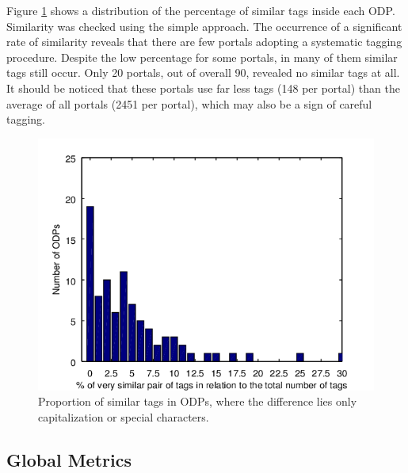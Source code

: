 Figure \ref{fig:similarity} shows a distribution of the percentage of similar tags inside each ODP.
Similarity was checked using the simple approach.
The occurrence of a significant rate of similarity reveals that there are few portals adopting a systematic tagging procedure.
Despite the low percentage for some portals, in many of them similar tags still occur.
Only 20 portals, out of overall 90, revealed no similar tags at all. 
It should be noticed that these portals use far less tags (148 per portal) than the average of all portals (2451 per portal), which may also be a sign of careful tagging.

\begin{figure}[tb]
\begin{center}
\includegraphics[scale=1.2]{images/similarity.png}
\caption{Proportion of similar tags in ODPs, where the difference lies only capitalization or special characters.}
\label{fig:similarity}
\end{center}
\end{figure}



\subsection{Global Metrics}
\label{sec:global_metrics}

